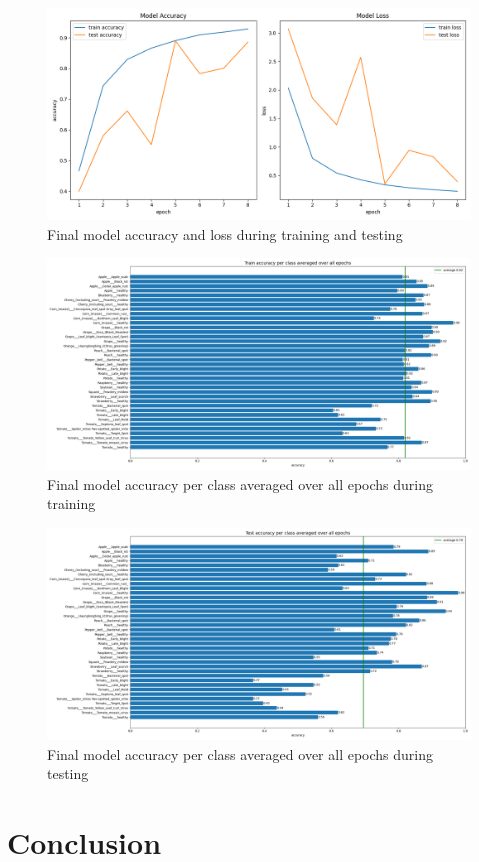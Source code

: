 \documentclass{BachelorBUI}
\begin{document}
    \begin{figure}[h]
        \centering
        \includegraphics[width=\textwidth]{final_accuracy_and_loss_2024-11-25_11.16.13.png}
        \caption{\centering Final model accuracy and loss during training and testing}
        \label{fig:final-accuracy-and-loss}
    \end{figure}
    \begin{figure}[h]
        \centering
        \includegraphics[width=\textwidth]{final_train_accuracy_per_class_2024-11-25_11.16.13.png}
        \caption{\centering Final model accuracy per class averaged over all epochs during training}
        \label{fig:final-train-accuracy-per-class}
    \end{figure}
    \begin{figure}[h]
        \centering
        \includegraphics[width=\textwidth]{final_test_accuracy_per_class_2024-11-25_11.16.14.png}
        \caption{\centering Final model accuracy per class averaged over all epochs during testing}
        \label{fig:final-test-accuracy-per-class}
    \end{figure}



\section{Conclusion}

\clearpage
\printbibliography
\end{document}
